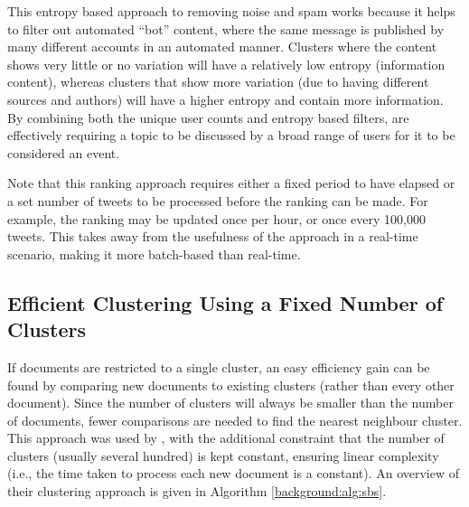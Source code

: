 This entropy based approach to removing noise and spam works because it helps to filter out automated ``bot'' content, where the same message is published by many different accounts in an automated manner.
Clusters where the content shows very little or no variation will have a relatively low entropy (information content), whereas clusters that show more variation (due to having different sources and authors) will have a higher entropy and contain more information.
By combining both the unique user counts and entropy based filters, \cite{Petrovic:2010:SFS:1857999.1858020} are effectively requiring a topic to be discussed by a broad range of users for it to be considered an event.

Note that this ranking approach requires either a fixed period to have elapsed or a set number of tweets to be processed before the ranking can be made.
For example, the ranking may be updated once per hour, or once every 100,000 tweets.
This takes away from the usefulness of the approach in a real-time scenario, making it more batch-based than real-time.

\subsection{Efficient Clustering Using a Fixed Number of Clusters}
\label{background:cs}
If documents are restricted to a single cluster, an easy efficiency gain can be found by comparing new documents to existing clusters (rather than every other document).
Since the number of clusters will always be smaller than the number of documents, fewer comparisons are needed to find the nearest neighbour cluster.
This approach was used by \cite{Aggarwal12}, with the additional constraint that the number of clusters (usually several hundred) is kept constant, ensuring linear complexity (i.e., the time taken to process each new document is a constant).
An overview of their clustering approach is given in Algorithm \ref{background:alg:sbs}.

